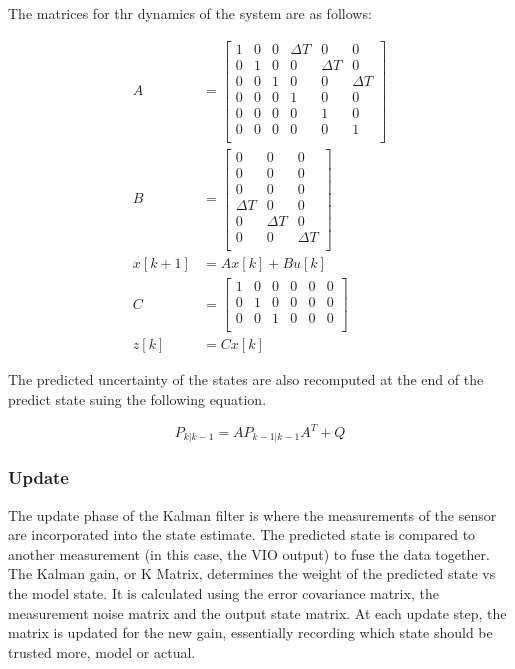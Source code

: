 \documentclass[bare_jrnl_transmag]{subfiles}
\begin{document}
The matrices for thr dynamics of the system are as follows:

\begin{align*}
    A &= 
    \begin{bmatrix}
    1 & 0 & 0 & \Delta T & 0 & 0 \\
    0 & 1 & 0 & 0 & \Delta T & 0 \\
    0 & 0 & 1 & 0 & 0 & \Delta T \\
    0 & 0 & 0 & 1 & 0 & 0 \\
    0 & 0 & 0 & 0 & 1 & 0 \\
    0 & 0 & 0 & 0 & 0 & 1 \\
    \end{bmatrix}
    \\[1em]
    B &= 
    \begin{bmatrix}
    0 & 0 & 0 \\
    0 & 0 & 0 \\
    0 & 0 & 0 \\
    \Delta T & 0 & 0 \\
    0 & \Delta T & 0 \\
    0 & 0 & \Delta T \\
    \end{bmatrix}
    \\[1em]
    x[k+1] &= A x[k] + B u[k]
    \\[1em]
    C &= 
    \begin{bmatrix}
    1 & 0 & 0 & 0 & 0 & 0 \\
    0 & 1 & 0 & 0 & 0 & 0 \\
    0 & 0 & 1 & 0 & 0 & 0 \\
    \end{bmatrix}
    \\[1em]
    z[k] &= C x[k]
\end{align*}

The predicted uncertainty of the states are also recomputed at the end of the predict state suing the following equation.

\begin{equation*}
    P_{k|k-1} = A P_{k-1|k-1} A^T + Q
\end{equation*}

\subsubsection{Update}
The update phase of the Kalman filter is where the measurements of the sensor are incorporated into the state estimate. The predicted state is compared to another measurement (in this case, the VIO output) to fuse the data together. 
The Kalman gain, or K Matrix, determines the weight of the predicted state vs the model state. It is calculated using the error covariance matrix, the measurement noise matrix and the output state matrix. 
At each update step, the matrix is updated for the new gain, essentially recording which state should be trusted more, model or actual.
\end{document}
